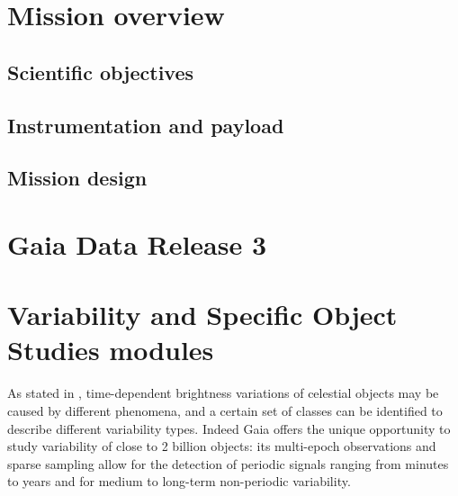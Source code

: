

\section{Mission overview}


\parencite{2016}

\subsection{Scientific objectives}



\subsection{Instrumentation and payload}  
\subsection{Mission design}
\section{Gaia Data Release 3}
\parencite{https://doi.org/10.48550/arxiv.2208.00211}
\section{Variability and Specific Object Studies modules}


As stated in \cite{Rimoldini}, time-dependent brightness variations of celestial objects may
be caused by different phenomena, and a certain set of
classes can be identified to describe different variability types.
Indeed Gaia offers the unique opportunity to study variability of close to 2 billion objects: its
multi-epoch observations and sparse sampling allow for the
detection of periodic signals ranging from minutes to years and
for medium to long-term non-periodic variability.

